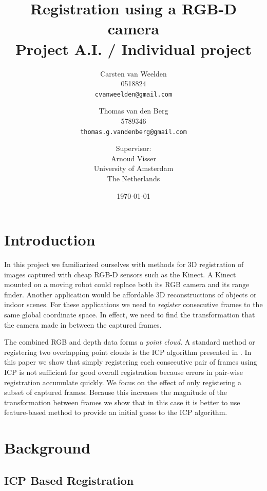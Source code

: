 \documentclass[a4paper]{article}
\title{Registration using a RGB-D camera\\
{\large Project A.I. / Individual project}}
\author{Carsten van Weelden \\ 0518824 \\ \texttt{cvanweelden@gmail.com} \and Thomas van den Berg \\ 5789346 \\ \texttt{thomas.g.vandenberg@gmail.com} \and
 \small{Supervisor:} \\ Arnoud Visser \\ University of Amsterdam\\
  The Netherlands}
\date{\today}
\begin{document}
\maketitle

\section{Introduction}

In this project we familiarized ourselves with methods for 3D registration of images captured with cheap RGB-D sensors such as the Kinect. A Kinect mounted on a moving robot could replace both its RGB camera and its range finder. Another application would be affordable 3D reconstructions of objects or indoor scenes. For these applications we need to \emph{register} consecutive frames to the same global coordinate space. In effect, we need to find the transformation that the camera made in between the captured frames. %



The combined RGB and depth data forms a \emph{point cloud}. A standard method or registering two overlapping point clouds is the \ac{ICP} algorithm presented in \cite{besl1992method}. In this paper we show that simply registering each consecutive pair of frames using \ac{ICP} is not sufficient for good overall registration because errors in pair-wise registration accumulate quickly. We focus on the effect of only registering a subset of captured frames. Because this increases the magnitude of the transformation between frames we show that in this case it is better to use feature-based method to provide an initial guess to the \ac{ICP} algorithm.

\section{Background}

\subsection{ICP Based Registration}
\end{document}
